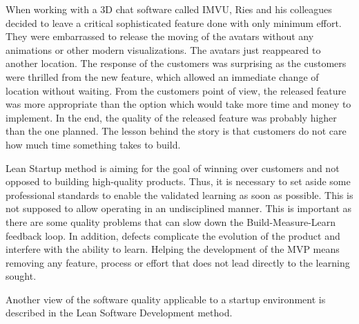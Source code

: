 When working with a 3D chat software called IMVU, Ries and his colleagues decided to leave a critical sophisticated feature done with only minimum effort. They were embarrassed to release the moving of the avatars without any animations or other modern visualizations. The avatars just reappeared to another location. The response of the customers was surprising as the customers were thrilled from the new feature, which allowed an immediate change of location without waiting. From the customers point of view, the released feature was more appropriate than the option which would take more time and money to implement. In the end, the quality of the released feature was probably higher than the one planned. The lesson behind the story is that customers do not care how much time something takes to build.

Lean Startup method is aiming for the goal of winning over customers and not opposed to building high-quality products. Thus, it is necessary to set aside some professional standards to enable the validated learning as soon as possible. This is not supposed to allow operating in an undisciplined manner. This is important as there are some quality problems that can slow down the Build-Measure-Learn feedback loop. In addition, defects complicate the evolution of the product and interfere with the ability to learn. Helping the development of the MVP means removing any feature, process or effort that does not lead directly to the learning sought.

Another view of the software quality applicable to a startup environment is described in the Lean Software Development method.~\cite{poppendieck2003LSD}








% 














